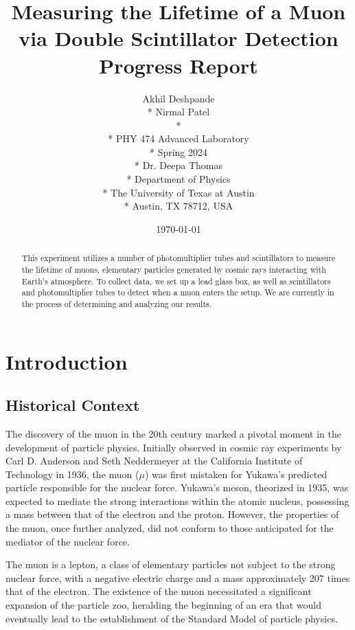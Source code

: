 \documentclass[10pt,letterpaper,onecolumn]{article}
\begin{document}

\title{Measuring the Lifetime of a Muon via Double Scintillator Detection\\
\large{Progress Report}}

\author{
 Akhil Deshpande \\*
 Nirmal Patel \\*
 \\*
 PHY 474 Advanced Laboratory \\*
 Spring 2024 \\*
 Dr. Deepa Thomas \\*
 Department of Physics \\*
 The University of Texas at Austin \\*
 Austin, TX 78712, USA
}
\date{\today}
\maketitle
\begin{abstract}
    This experiment utilizes a number of photomultiplier tubes and scintillators to measure the lifetime of muons, elementary particles generated by cosmic rays interacting with Earth's atmosphere. To collect data, we set up a lead glass box, as well as scintillators and photomultiplier tubes to detect when a muon enters the setup. We are currently in the process of determining and analyzing our results.
\end{abstract}
\section{Introduction}
\subsection{Historical Context}
The discovery of the muon in the 20th century marked a pivotal moment in the development of particle physics. Initially observed in cosmic ray experiments by Carl D. Anderson and Seth Neddermeyer at the California Institute of Technology in 1936, \cite{StreetStevenson:1937} the muon ($\mu$) was first mistaken for Yukawa's predicted particle responsible for the nuclear force. Yukawa's meson, theorized in 1935, was expected to mediate the strong interactions within the atomic nucleus, possessing a mass between that of the electron and the proton. However, the properties of the muon, once further analyzed, did not conform to those anticipated for the mediator of the nuclear force. \cite{Yukawa1935}


The muon is a lepton, a class of elementary particles not subject to the strong nuclear force, with a negative electric charge and a mass approximately 207 times that of the electron. \cite{CODATA2018MuonElectronMassRatio} The existence of the muon necessitated a significant expansion of the particle zoo, heralding the beginning of an era that would eventually lead to the establishment of the Standard Model of particle physics.
\end{document}
